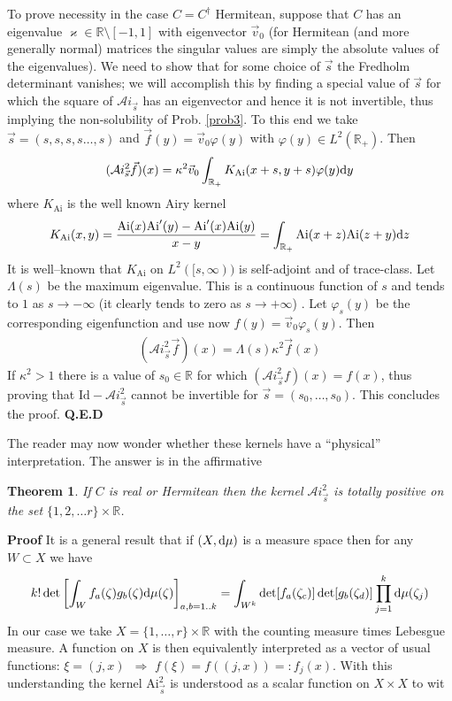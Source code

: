 \documentclass{article}
\newtheorem{theorem}{Theorem}[section]
\def\R{{\mathbb R}}
\def\d{{\rm d}}
\def\Id{\mathrm{Id}}
\def\Ai{\mathrm{Ai}}
\def\Ai{\mathrm{Ai}}
\def\QED{ {\bf Q.E.D}\par \vskip 4pt}
\newcommand{\be}{\begin{eqnarray}}
\newcommand{\ee}{\end{eqnarray}}
\def\le{\left}
\def\ri{\right}
\begin{document}
To prove necessity in the case $C=C^\dagger$ Hermitean,  suppose that $C$ has an eigenvalue $\varkappa\in \R\setminus [-1,1]$ with eigenvector $\vec v_0$ (for Hermitean (and more generally normal) matrices the singular values are simply the absolute values of the eigenvalues). We need to show that for some choice of $\vec s$ the Fredholm determinant vanishes; we will accomplish this by finding a special value of $\vec s$ for which the square of $\mathcal Ai_{\vec s}$ has an eigenvector and hence it is not invertible, thus implying the non-solubility of Prob. \ref{prob3}. To this end we take $\vec s = (s,s,s,s\dots,s)$ and $\vec f(y) = \vec v_0 \varphi(y)$ with $\varphi(y)\in L^2(\R_+)$. Then 
\be
(\mathcal Ai_{\vec s}^2 \vec f)(x) =  \kappa^2 \vec v_0 \int_{\R_+} K_{\Ai}(x+s ,y+s ) \varphi(y) \d y
\ee
where $K_{\Ai}$ is the well known Airy kernel
\be
K_{\Ai}(x,y) = \frac {\Ai(x) \Ai'(y)- \Ai'(x) \Ai(y)} {x-y}= \int_{\R_+} \Ai(x+z) \Ai(z+y)\d z
\ee
It is well--known that $K_{\Ai}$ on $L^2([s,\infty))$ is self-adjoint and of trace-class. Let $\Lambda(s)$ be the maximum eigenvalue. This is a continuous function of $s$ and tends to $1$ as $s\to-\infty$ (it clearly tends to zero as $s\to +\infty$) \cite{TracyWidomLevel}. Let $\varphi_s(y)$ be the corresponding eigenfunction and use now $f(y) = \vec v_0 \varphi_s(y)$.
Then 
\be
({\mathcal Ai}_{\vec s}^2 \vec f)(x)  = \Lambda (s)\kappa^2 \vec f(x)
\ee
If $\kappa^2>1$ there is a value of $s_0\in \R$ for which $({\mathcal  Ai}_{\vec s}^2 f)(x)=f(x)$, thus proving that $\Id - \mathcal Ai_{\vec s}^2$ cannot be invertible for $\vec s =(s_0,\dots, s_0)$. This concludes the proof.
 \QED
 The reader may now wonder whether these kernels have a ``physical'' interpretation. The answer is in the affirmative 
 \begin {theorem}
 \label{thmdetpp}
If $C$ is real or Hermitean then the kernel $\mathcal Ai^2_{\vec s}$ is totally positive on the set $\{1,2,\dots r\} \times \R$.
 \end{theorem}
 {\bf Proof}
 It is a general result that if $(X,\d\mu)$ is a measure space  then for any $W\subset X$ we have 
 \be
k! \det\le[\int_W f_a(\zeta) g_b(\zeta) \d\mu(\zeta)\ri]_{a,b=1..k} = \int_{W^k}\det [f_a(\zeta_c)] \det [g_b(\zeta_d)]  \prod_{j=1}^k \d\mu(\zeta_j) \label{debruijn}
 \ee
 In our case we take $X=\{1,\dots,r\}\times \R$ with the counting measure times Lebesgue measure. A function on $X$ is then equivalently interpreted as a vector of usual functions: $\xi=(j,x)$\ $\Rightarrow$ $f(\xi) = f((j,x))=:f_j(x)$. With this understanding the kernel $\Ai^2_{\vec s}$ is understood as a scalar function on $X\times X$ to wit
\end{document}
